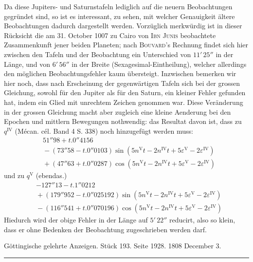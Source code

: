 Da diese Jupiters- und Saturnstafeln lediglich auf die neuern Beobachtungen gegründet sind, so ist es interessant, zu sehen, mit welcher Genauigkeit ältere Beobachtungen dadurch dargestellt werden. Vorzüglich merkwürdig ist in dieser Rücksicht die am 31. October 1007 zu Cairo von \textsc{Ibn Junis} beobachtete Zusammenkunft jener beiden Planeten; nach \textsc{Bouvard}'s Rechnung findet sich hier zwischen den Tafeln und der Beobachtung ein Unterschied von $11'\,25''$ in der Länge, und von $6'\,56''$ in der Breite (Sexagesimal-Eintheilung), welcher allerdings den möglichen Beobachtungsfehler kaum übersteigt. Inzwischen bemerken wir hier noch, dass nach Erscheinung der gegenwärtigen Tafeln sich bei der grossen Gleichung, sowohl für den Jupiter als für den Saturn, ein kleiner Fehler gefunden hat, indem ein Glied mit unrechtem Zeichen genommen war. Diese Veränderung in der grossen Gleichung macht aber zugleich eine kleine Aenderung bei den Epochen und mittlern Bewegungen nothwendig: das Resultat davon ist, dass zu $q^{\mathrm{IV}}$ (Mécan. cél. Band 4 S. 338) noch hinzugefügt werden muss:
\[
\begin{aligned}
&51''98 + t.0''4156\\
&{}- (73''58 - t.0''0103)\sin(5n^{\mathrm{V}}t - 2n^{\mathrm{IV}}t + 5\varepsilon^{\mathrm{V}} - 2\varepsilon^{\mathrm{IV}})\\
&{}+ (47''63 + t.0''0287)\cos(5n^{\mathrm{V}}t - 2n^{\mathrm{IV}}t + 5\varepsilon^{\mathrm{V}} - 2\varepsilon^{\mathrm{IV}})
\end{aligned}
\]
und zu $q^{\mathrm{V}}$ (ebendas.)
\[
\begin{aligned}
&-127''13 - t.1''0212\\
&{}+ (179''952 - t.0''025192)\sin(5n^{\mathrm{V}}t - 2n^{\mathrm{IV}}t + 5\varepsilon^{\mathrm{V}} - 2\varepsilon^{\mathrm{IV}})\\
&{}- (116''541 + t.0''070196)\cos(5n^{\mathrm{V}}t - 2n^{\mathrm{IV}}t + 5\varepsilon^{\mathrm{V}} - 2\varepsilon^{\mathrm{IV}})
\end{aligned}
\]
Hiedurch wird der obige Fehler in der Länge auf $5'\,22''$ reducirt, also so klein, dass er ohne Bedenken der Beobachtung zugeschrieben werden darf.

\clearpage
{}
\hypertarget{native-514-lower}{}\label{native-514-lower}
\begin{center}\small Göttingische gelehrte Anzeigen. Stück 193. Seite 1928. 1808 December 3.\\[3pt]\rule{.72\linewidth}{.3pt}\end{center}

